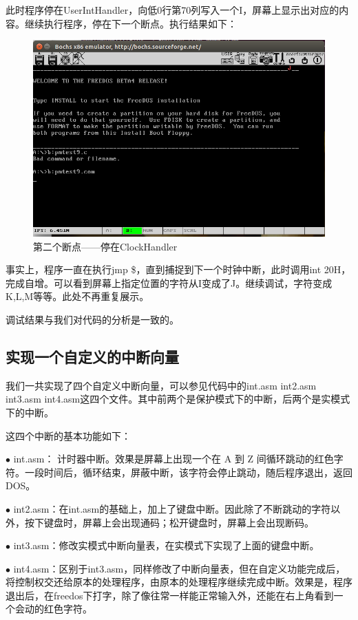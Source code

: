 \documentclass[UTF8,12pt]{ctexart}
\begin{document}
    此时程序停在UserIntHandler，向低0行第70列写入一个I，屏幕上显示出对应的内容。继续执行程序，停在下一个断点。执行结果如下：
    \begin{figure}[H]
        \centering
        \includegraphics[width=12cm]{images/show_J.png}
        \caption{第二个断点——停在ClockHandler}
        \label{breakpoint2}
    \end{figure}
    
    事实上，程序一直在执行jmp \$，直到捕捉到下一个时钟中断，此时调用int 20H，完成自增。可以看到屏幕上指定位置的字符从I变成了J。继续调试，字符变成K,L,M等等。此处不再重复展示。
    
    调试结果与我们对代码的分析是一致的。
    
    
    \subsection{实现一个自定义的中断向量}
    
    我们一共实现了四个自定义中断向量，可以参见代码中的int.asm int2.asm int3.asm int4.asm这四个文件。其中前两个是保护模式下的中断，后两个是实模式下的中断。
    
    这四个中断的基本功能如下：
    
    $\bullet$ int.asm： 计时器中断。效果是屏幕上出现一个在 A 到 Z 间循环跳动的红色字符。一段时间后，循环结束，屏蔽中断，该字符会停止跳动，随后程序退出，返回DOS。
    
    $\bullet$ int2.asm：在int.asm的基础上，加上了键盘中断。因此除了不断跳动的字符以外，按下键盘时，屏幕上会出现通码；松开键盘时，屏幕上会出现断码。

    $\bullet$ int3.asm：修改实模式中断向量表，在实模式下实现了上面的键盘中断。
    
    $\bullet$ int4.asm：区别于int3.asm，同样修改了中断向量表，但在自定义功能完成后，将控制权交还给原本的处理程序，由原本的处理程序继续完成中断。效果是，程序退出后，在freedos下打字，除了像往常一样能正常输入外，还能在右上角看到一个会动的红色字符。
    
\end{document}
